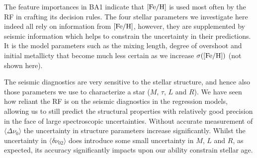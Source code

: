 The feature importances in BA1 indicate that $[\rm{Fe/H}]$ is used most often by the RF in  crafting its decision rules.  The four stellar parameters we investigate here indeed all rely on information from $[\rm{Fe/H}]$, however, they are supplemented by seismic information which helps to constrain the uncertainty in their predictions. It is the model parameters such as the mixing length, degree of overshoot and initial metallicty  that become much less certain as we increase $\sigma([\rm{Fe/H}])$ (not shown here).  

 

The seismic diagnostics are very sensitive to the stellar structure, and hence also those  parameters we use to characterize a star ($M$, $\tau$, $L$ and $R$). We have seen how reliant the RF is on the seismic diagnostics in the  regression models, allowing us to still predict the structural properties with relatively good precision in the face of large spectroscopic uncertainties. Without accurate measurement of $\langle\Delta\nu_0\rangle$ the uncertainty in structure parameters increase significantly. Whilst the uncertainty in $\langle\delta\nu_{02}\rangle$ does introduce some small uncertainty in $M$, $L$ and $R$, as expected, its accuracy significantly impacts upon our ability constrain stellar age. 





